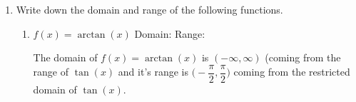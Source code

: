 \documentclass{article}
\begin{document}
\begin{enumerate}
\begin{enumerate}
\begin{solution}
    \begin{align*}
        490\cos(\tfrac{\pi}{2}t)+510 &= 90 \\
        490\cos(\tfrac{\pi}{2}t) &= -420 \\
        \cos(\tfrac{\pi}{2}t) &= -\tfrac{6}{7} \\
        \intertext{Based on the graph, we want the first three positive solutions, which would be }
        \tfrac{\pi}{2}t &= \arccos(-\tfrac{6}{7}),\ 2\pi- \arccos(-\tfrac{6}{7}),\ 2\pi + \arccos(-\tfrac{6}{7}) \\
        t &= \tfrac{2}{\pi}\arccos(-\tfrac{6}{7}),\ 4-\tfrac{2}{\pi}\arccos(-\tfrac{6}{7}),\ 4+\tfrac{2}{\pi}\arccos(-\tfrac{6}{7}).\\
        \intertext{Alternatively, we could have used $\arccos(\tfrac{6}{7})$ to express the solutions:}
        \tfrac{\pi}{2}t &= \pi-\arccos(\tfrac{6}{7}),\ \pi+\arccos(\tfrac{6}{7}),\ 3\pi - \arccos(\tfrac{6}{7}) \\
        t &=  2-\tfrac{2}{\pi}\arccos(\tfrac{6}{7}),\ 2+\tfrac{2}{\pi}\arccos(\tfrac{6}{7}),\ 6-\tfrac{2}{\pi}\arccos(\tfrac{6}{7}).
    \end{align*}

    We could have also found the first positive solution, $t=\tfrac{2}{\pi}\arccos(-\tfrac{6}{7})$ and then used the period, $4$, to derive the other solutions.
\end{solution}

  \end{enumerate}

  \item %
Write down the domain and range of the following functions.
        \begin{enumerate}
            \item $f(x) = \arctan(x)$ \hfill Domain: \solonly{$(-\infty, \infty)$}\hfill Range: \hfill \phantom{.}

            \begin{solution}
                The domain of $f(x)= \arctan(x)$ is $(-\infty, \infty)$ (coming from the range of $\tan(x)$ and it's range is $\Big( -\dfrac{\pi}{2}, \dfrac{\pi}{2}\Big)$ coming from the restricted domain of $\tan(x)$.
            \end{solution}
            
            \vspace{.5 in}
            

\end{enumerate}
\end{enumerate}
\end{document}
